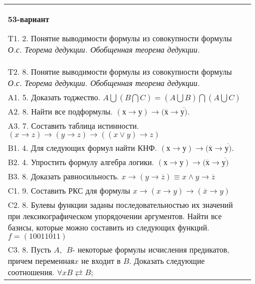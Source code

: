 \documentclass{article}
\begin{document}
\begin{tabular}{m{17cm}}
\textbf{53-вариант}
\newline

T1. 2. Понятие выводимости формулы из совокупности формулы \emph{О.с. Теорема дедукции. Обобщенная теорема дедукции.} \\
T2. 8. Понятие выводимости формулы из совокупности формулы \emph{О.с. Теорема дедукции. Обобщенная теорема дедукции.} \\
A1. 5. Доказать тоджество. \(A\bigcup(B\bigcap C) = (A\bigcup B)\bigcap(A\bigcup C)\) \\
A2. 8. Найти все подформулы. \((х \rightarrow у) \rightarrow (\overline{х} \rightarrow \overline{у)}\). \\
A3. 7. Составить таблица истинности. \((x \rightarrow z) \rightarrow (y \rightarrow z) \rightarrow ((x \vee y) \rightarrow z)\) \\
B1. 4. Для следующих формул найти КНФ. \((х \rightarrow у) \rightarrow (\overline{х} \rightarrow \overline{у)}\). \\
B2. 4. Упростить формулу алгебра логики. \((х \rightarrow у) \rightarrow (\overline{х} \rightarrow \overline{у)}\) \\
B3. 8. Доказать равносильность. \(x \rightarrow \left( y \rightarrow \overline{z} \right) \equiv x \land y \rightarrow \overline{z}\) \\
C1. 9. Составить РКС для формулы \(x \rightarrow (x \rightarrow y) \rightarrow (\overline{x} \rightarrow y)\ \) \\
C2. 8. Булевы функции заданы последовательностью их значений при лексикографическом упорядочении аргументов. Найти все базисы, которые можно составить из следующих функций. \(f = (10011011)\) \\
C3. 8. Пусть \(A,\ \ B\)- некоторые формулы исчисления предикатов, причем переменная\(x\) не входит в \(B\). Доказать следующие соотношения. \(\forall xB \rightleftarrows B\); \\

\end{tabular}
\vspace{1cm}
\end{document}
